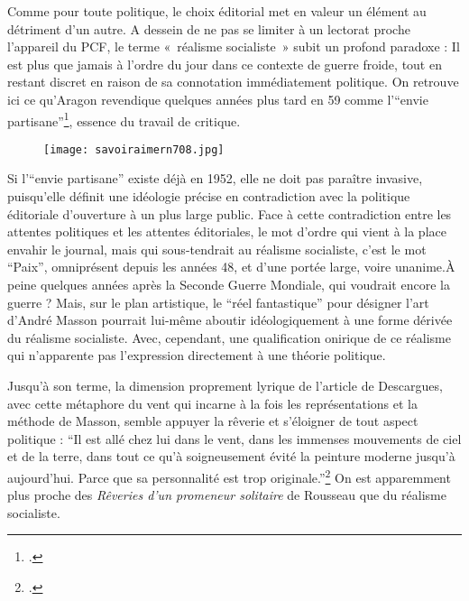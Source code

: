 	Comme pour toute politique, le choix éditorial met en valeur un élément au détriment d’un autre. A dessein de ne pas se limiter à un lectorat proche l’appareil du PCF, le terme « réalisme socialiste » subit un profond paradoxe : Il est plus que jamais à l’ordre du jour dans ce contexte de guerre froide, tout en restant discret en raison de sa connotation immédiatement politique. On retrouve ici ce qu’Aragon revendique quelques années plus tard en 59 comme l’\enquote{envie partisane}\footcite{savoiraimer}, essence du travail de critique. 

	\begin{figure}[H]
   \centering
   \texttt{[image: savoiraimern708.jpg]}
	\caption{\cite{savoiraimer}}\label{fig:Savoiraimer}
\end{figure}


Si l’\enquote{envie partisane} existe déjà en 1952, elle ne doit pas paraître invasive, puisqu’elle définit une idéologie précise en contradiction avec la politique éditoriale d’ouverture à un plus large public. Face à cette contradiction entre les attentes politiques et les attentes éditoriales, le mot d’ordre qui vient à la place envahir le journal, mais qui sous-tendrait au réalisme socialiste, c’est le mot \enquote{Paix}, omniprésent depuis les années 48, et d’une portée large, voire unanime.À peine quelques années après la Seconde Guerre Mondiale, qui voudrait encore la guerre ? Mais, sur le plan artistique, le \enquote{réel fantastique} pour désigner l’art d’André Masson pourrait lui-même aboutir idéologiquement à une forme dérivée du réalisme socialiste. Avec, cependant, une qualification onirique de ce réalisme qui n’apparente pas l’expression directement à une théorie politique. 

Jusqu’à son terme, la dimension proprement lyrique de l’article de Descargues, avec cette métaphore du vent qui incarne à la fois les représentations et la méthode de Masson, semble appuyer la rêverie et s’éloigner de tout aspect politique : \enquote{Il est allé chez lui dans le vent, dans les immenses mouvements de ciel et de la terre, dans tout ce qu’à soigneusement évité la peinture moderne jusqu’à aujourd’hui. Parce que sa personnalité est trop originale.}\footcite{atraversgaleries} On est apparemment plus proche des \emph{Rêveries d’un promeneur solitaire} de Rousseau que du réalisme socialiste. 

